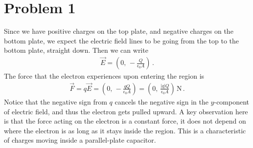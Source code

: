 \documentclass[11pt]{article}
\begin{document}
\section*{Problem 1}
Since we have positive charges on the top plate, and negative charges on the bottom plate, we expect the electric field lines to be going from the top to the bottom plate, straight down. Then we can write
\begin{align*}
\vec{E} = \left(0,\, -\frac{Q}{\epsilon_0 A}\right)\,.
\end{align*}
The force that the electron experiences upon entering the region is 
\begin{align*}
\vec{F} = q\vec{E} = \left(0,\, -\frac{qQ}{\epsilon_0 A}\right) = \left( 0,\, \frac{|q|Q}{\epsilon_0 A} \right)\,\text{N}\,.
\end{align*}
Notice that the negative sign from $q$ cancels the negative sign in the $y$-component of electric field, and thus the electron gets pulled upward. A key observation here is that the force acting on the electron is a constant force, it does not depend on where the electron is as long as it stays inside the region. This is a characteristic of charges moving inside a parallel-plate capacitor. \\
\end{document}
